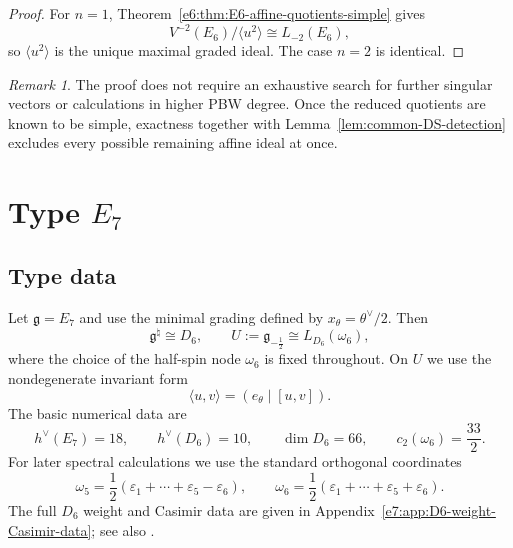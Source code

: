 \documentclass[11pt,reqno]{amsart}
\theoremstyle{definition}
\theoremstyle{remark}
\newtheorem{remark}[theorem]{Remark}
\begin{document}
\begin{proof}
For $n=1$, Theorem~\ref{e6:thm:E6-affine-quotients-simple} gives
\[
  V^{-2}(E_6)/\langle u^2\rangle\cong L_{-2}(E_6),
\]
so $\langle u^2\rangle$ is the unique maximal graded ideal.  The case $n=2$
is identical.
\end{proof}

\begin{remark}
The proof does not require an exhaustive search for further singular vectors or
calculations in higher PBW degree.  Once the reduced quotients are known to be
simple, exactness together with
Lemma~\ref{lem:common-DS-detection} excludes every possible remaining
affine ideal at once.
\end{remark}
\section{Type \texorpdfstring{$E_7$}{E7}}



\subsection{Type data}
\label{e7:sec:preliminaries}

Let $\mathfrak g=E_7$ and use the minimal grading defined by
$x_\theta=\theta^\vee/2$.  Then
\begin{equation*}
 \mathfrak g^\natural\cong D_6,
 \qquad
 U:=\mathfrak g_{-\frac12}\cong L_{D_6}(\omega_6),
\end{equation*}
where the choice of the half-spin node $\omega_6$ is fixed throughout.  On
$U$ we use the nondegenerate invariant form
\begin{equation}
 \langle u,v\rangle=(e_\theta\mid[u,v]).
 \label{e7:eq:E7-half-spin-symplectic-form}
\end{equation}
The basic numerical data are
\begin{equation}
 h^\vee(E_7)=18,
 \qquad h^\vee(D_6)=10,
 \qquad \dim D_6=66,
 \qquad c_2(\omega_6)=\frac{33}{2}.
 \label{e7:eq:E7-half-spin-Casimir-data}
\end{equation}
For later spectral calculations we use the standard orthogonal coordinates
\begin{equation}
 \omega_5=\frac12(\varepsilon_1+\cdots+\varepsilon_5-\varepsilon_6),
 \qquad
 \omega_6=\frac12(\varepsilon_1+\cdots+\varepsilon_5+\varepsilon_6).
 \label{e7:eq:D6-spin-weight-coordinates}
\end{equation}
The full $D_6$ weight and Casimir data are given in
Appendix~\ref{e7:app:D6-weight-Casimir-data}; see also
\cite{KacWakimoto2004,KacWakimoto2005,
ArakawaCreutzigKawasetsuLinshaw2017}.
\end{document}

